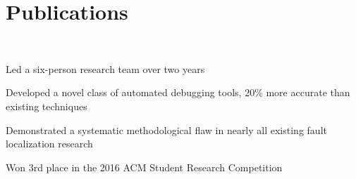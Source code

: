 \documentclass[]{resume}
\begin{document}
\begin{minipage}[t]{0.66\textwidth}

%





\section{Publications}

 \\
\begin{tightemize}
\item Led a six-person research team over two years
\item Developed a novel class of automated debugging tools, 20\% more accurate than existing techniques
\item Demonstrated a systematic methodological flaw in nearly all existing fault localization research
\item Won 3rd place in the 2016 ACM Student Research Competition
\end{tightemize}
\sectionsep

\end{minipage}
\end{document}
